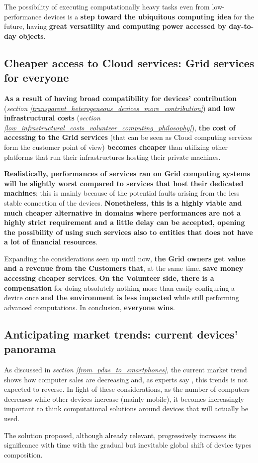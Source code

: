 The possibility of executing computationally heavy tasks even from low-performance devices is a \textbf{step toward the ubiquitous computing idea} for the future, having \textbf{great versatility and computing power accessed by day-to-day objects}.

\subsection{Cheaper access to Cloud services: Grid services for everyone}\label{cheaper_access_to_cloud_services}
\textbf{As a result of having broad compatibility for devices' contribution} (\textit{section \ref{transparent_heterogeneous_devices_more_contribution}}) \textbf{and low infrastructural costs} (\textit{section \ref{low_infrastructural_costs_volunteer_computing_philosophy}}), \textbf{the cost of accessing to the Grid services} (that can be seen as Cloud computing services form the customer point of view) \textbf{becomes cheaper} than utilizing other platforms that run their infrastructures hosting their private machines.

\textbf{Realistically, performances of services ran on Grid computing systems will be slightly worst compared to services that host their dedicated machines}; this is mainly because of the potential faults arising from the less stable connection of the devices. \textbf{Nonetheless, this is a highly viable and much cheaper alternative in domains where performances are not a highly strict requirement and a little delay can be accepted, opening the possibility of using such services also to entities that does not have a lot of financial resources}.

Expanding the considerations seen up until now, \textbf{the Grid owners get value and a revenue from the Customers that}, at the same time, \textbf{save money accessing cheaper services}. \textbf{On the Volunteer side, there is a compensation} for doing absolutely nothing more than easily configuring a device once \textbf{and the environment is less impacted} while still performing advanced computations. In conclusion, \textbf{everyone wins}. 

\subsection{Anticipating market trends: current devices' panorama}
As discussed in \textit{section \ref{from_pdas_to_smartphones}}, the current market trend shows how computer sales are decreasing and, as experts say \cite{smartphones_sales}, this trends is not expected to reverse. In light of these considerations, as the number of computers decreases while other devices increase (mainly mobile), it becomes increasingly important to think computational solutions around devices that will actually be used.

The solution proposed, although already relevant, progressively increases its significance with time with the gradual but inevitable global shift of device types composition.